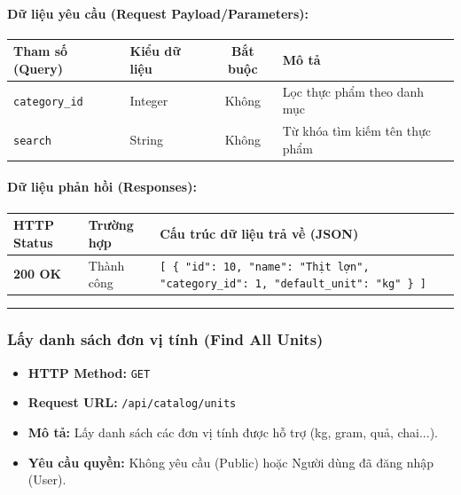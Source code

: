 \documentclass[12pt,a4paper]{article}
\begin{document}
\paragraph{Dữ liệu yêu cầu (Request Payload/Parameters):}
\begin{longtable}{|>{\raggedright\arraybackslash}p{2.8cm}|>{\raggedright\arraybackslash}p{2.2cm}|c|>{\raggedright\arraybackslash}p{7.0cm}|}
\hline
\textbf{Tham số (Query)} & \textbf{Kiểu dữ liệu} & \textbf{Bắt buộc} & \textbf{Mô tả} \\ \hline
\endhead
\texttt{category\_id} & Integer & Không & Lọc thực phẩm theo danh mục \\ \hline
\texttt{search} & String & Không & Từ khóa tìm kiếm tên thực phẩm \\ \hline
\end{longtable}

\paragraph{Dữ liệu phản hồi (Responses):}
\begin{longtable}{|>{\raggedright\arraybackslash}p{2.8cm}|>{\raggedright\arraybackslash}p{3.2cm}|>{\raggedright\arraybackslash}p{8.0cm}|}
\hline
\textbf{HTTP Status} & \textbf{Trường hợp} & \textbf{Cấu trúc dữ liệu trả về (JSON)} \\ \hline
\endhead
\textbf{200 OK} & Thành công & \texttt{[ \{ "id": 10, "name": "Thịt lợn", "category\_id": 1, "default\_unit": "kg" \} ]} \\ \hline
\end{longtable}

\vskip 0.4cm
\noindent\rule{\textwidth}{0.3pt}
\vskip 0.4cm

\subsubsection{Lấy danh sách đơn vị tính (Find All Units)}
\begin{itemize}[leftmargin=*]
    \item \textbf{HTTP Method:} \texttt{GET}
    \item \textbf{Request URL:} \texttt{/api/catalog/units}
    \item \textbf{Mô tả:} Lấy danh sách các đơn vị tính được hỗ trợ (kg, gram, quả, chai...).
    \item \textbf{Yêu cầu quyền:} Không yêu cầu (Public) hoặc Người dùng đã đăng nhập (User).
\end{itemize}
\end{document}
